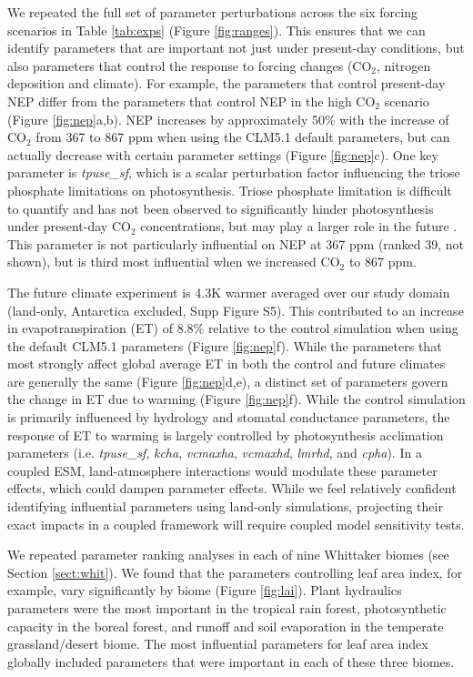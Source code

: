 \documentclass[draft]{agujournal2019}
\begin{document}
We repeated the full set of parameter perturbations across the six forcing scenarios in Table \ref{tab:exps} (Figure \ref{fig:ranges}). This ensures that we can identify parameters that are important not just under present-day conditions, but also parameters that control the response to forcing changes (CO$_2$, nitrogen deposition and climate). For example, the parameters that control present-day NEP differ  from the parameters that control NEP in the high CO$_2$ scenario (Figure \ref{fig:nep}a,b). NEP increases by approximately 50\% with the increase of CO$_2$ from 367 to 867 ppm when using the CLM5.1 default parameters, but can actually decrease with certain parameter settings (Figure \ref{fig:nep}c). One key parameter is \textit{tpuse\_sf}, which is a scalar perturbation factor influencing the triose phosphate limitations on photosynthesis. Triose phosphate limitation is difficult to quantify and has not been observed to significantly hinder photosynthesis under present-day CO$_2$ concentrations, but may play a larger role in the future \cite{lombardozzi2018,kumarathunge2019}. This parameter is not particularly influential on NEP at 367 ppm (ranked 39, not shown), but is third most influential when we increased CO$_2$ to 867 ppm. 

The future climate experiment is 4.3K warmer averaged over our study domain (land-only, Antarctica excluded, Supp Figure S5). This contributed to an increase in evapotranspiration (ET) of 8.8\% relative to the control simulation when using the default CLM5.1 parameters (Figure \ref{fig:nep}f). While the parameters that most strongly affect global average ET in both the control and future climates are generally the same (Figure \ref{fig:nep}d,e), a distinct set of parameters govern the change in ET due to warming (Figure \ref{fig:nep}f). While the control simulation is primarily influenced by hydrology and stomatal conductance parameters, the response of ET to warming is largely controlled by photosynthesis acclimation parameters (i.e. \textit{tpuse\_sf}, \textit{kcha}, \textit{vcmaxha}, \textit{vcmaxhd}, \textit{lmrhd}, and \textit{cpha}). In a coupled ESM, land-atmosphere interactions would modulate these parameter effects, which could dampen parameter effects. While we feel relatively confident identifying influential parameters using land-only simulations, projecting their exact impacts in a coupled framework will require coupled model sensitivity tests.

We repeated parameter ranking analyses in each of nine Whittaker biomes (see Section \ref{sect:whit}). We found that the parameters controlling leaf area index, for example, vary significantly by biome (Figure \ref{fig:lai}). Plant hydraulics parameters were the most important in the tropical rain forest, photosynthetic capacity in the boreal forest, and runoff and soil evaporation in the temperate grassland/desert biome. The most influential parameters for leaf area index globally included parameters that were important in each of these three biomes. 
\end{document}
